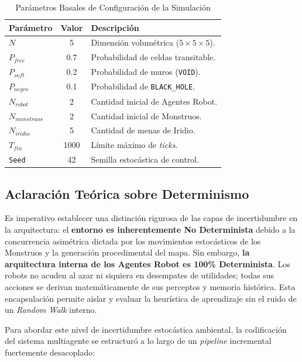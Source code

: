 \documentclass[conference]{IEEEtran}
\begin{document}
\begin{table}[htbp]
\caption{Parámetros Basales de Configuración de la Simulación}
\begin{center}
\begin{tabular}{|l|c|>{\raggedright\arraybackslash}p{4cm}|}
\hline
\textbf{Parámetro} & \textbf{Valor} & \textbf{Descripción} \\
\hline
$N$ & 5 & Dimensión volumétrica ($5\times5\times5$). \\
$P_{free}$ & 0.7 & Probabilidad de celdas transitable. \\
$P_{soft}$ & 0.2 & Probabilidad de muros (\texttt{VOID}). \\
$P_{negro}$ & 0.1 & Probabilidad de \texttt{BLACK\_HOLE}. \\
$N_{robot}$ & 2 & Cantidad inicial de Agentes Robot. \\
$N_{monstruos}$ & 2 & Cantidad inicial de Monstruos. \\
$N_{iridio}$ & 5 & Cantidad de menas de Iridio. \\
$T_{fin}$ & 1000 & Límite máximo de \textit{ticks}. \\
\texttt{Seed} & 42 & Semilla estocástica de control. \\
\hline
\end{tabular}
\end{center}
\end{table}

\subsection{Aclaración Teórica sobre Determinismo}
Es imperativo establecer una distinción rigurosa de las capas de incertidumbre en la arquitectura: el \textbf{entorno es inherentemente No Determinista} debido a la concurrencia asimétrica dictada por los movimientos estocásticos de los Monstruos y la generación procedimental del mapa. Sin embargo, \textbf{la arquitectura interna de los Agentes Robot es 100\% Determinista}. Los robots no acuden al azar ni siquiera en desempates de utilidades; todas sus acciones se derivan matemáticamente de sus perceptos y memoria histórica. Esta encapsulación permite aislar y evaluar la heurística de aprendizaje sin el ruido de un \textit{Random Walk} interno.

Para abordar este nivel de incertidumbre estocástica ambiental, la codificación del sistema multiagente se estructuró a lo largo de un \textit{pipeline} incremental fuertemente desacoplado:
\end{document}
